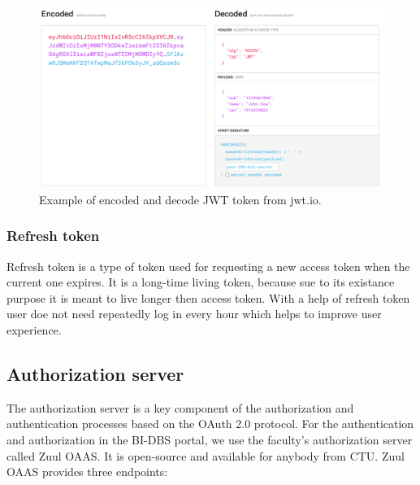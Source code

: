 \begin{figure}[hp]
\centering
\includegraphics[scale=0.31]{../png/jwt_token.png}
\caption{Example of encoded and decode JWT token from jwt.io.}
\end{figure}



\subsubsection{Refresh token} Refresh token is a type of token used for requesting a new access token when the current one expires. It is a long-time living token, because sue to its existance purpose it is meant to live longer then access token. With a help of refresh token user doe not need repeatedly log in every hour which helps to improve user experience.


\subsection{Authorization server} The authorization server is a key component of the authorization and authentication processes based on the OAuth 2.0 protocol. 
For the authentication and authorization in the BI-DBS portal, we use the faculty's authorization server called Zuul OAAS. It is open-source and available for anybody from CTU. Zuul OAAS provides three endpoints:

